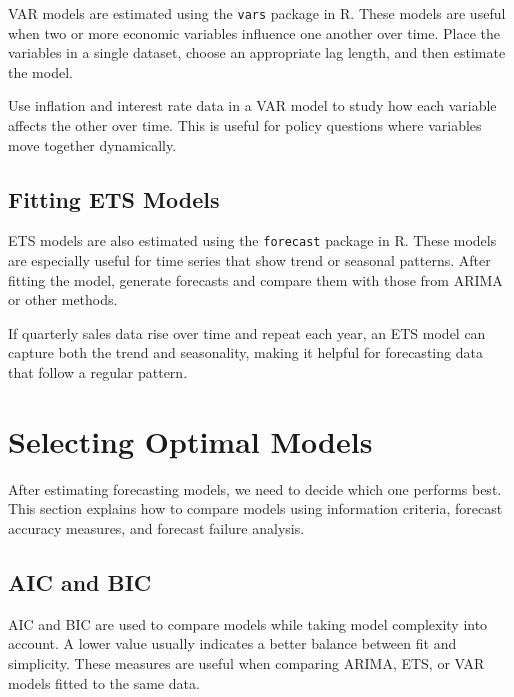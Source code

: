 \documentclass[12pt,a4paper]{article}
\begin{document}
VAR models are estimated using the \texttt{vars} package in R. These models are useful when two or more economic variables influence one another over time. Place the variables in a single dataset, choose an appropriate lag length, and then estimate the model.

\begin{example}
Use inflation and interest rate data in a VAR model to study how each variable affects the other over time. This is useful for policy questions where variables move together dynamically.
\end{example}

\subsection{Fitting ETS Models}

ETS models are also estimated using the \texttt{forecast} package in R. These models are especially useful for time series that show trend or seasonal patterns. After fitting the model, generate forecasts and compare them with those from ARIMA or other methods.

\begin{example}
If quarterly sales data rise over time and repeat each year, an ETS model can capture both the trend and seasonality, making it helpful for forecasting data that follow a regular pattern.
\end{example}

\section{Selecting Optimal Models}

After estimating forecasting models, we need to decide which one performs best. This section explains how to compare models using information criteria, forecast accuracy measures, and forecast failure analysis.

\subsection{AIC and BIC}

AIC and BIC are used to compare models while taking model complexity into account. A lower value usually indicates a better balance between fit and simplicity. These measures are useful when comparing ARIMA, ETS, or VAR models fitted to the same data.
\end{document}
